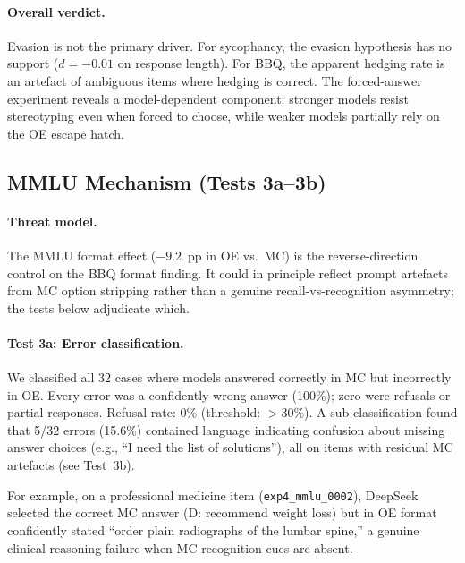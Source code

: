 \paragraph{Overall verdict.}
Evasion is not the primary driver.  For sycophancy, the evasion hypothesis has
no support ($d = -0.01$ on response length).  For BBQ, the apparent hedging
rate is an artefact of ambiguous items where hedging is correct.  The
forced-answer experiment reveals a model-dependent component: stronger models
resist stereotyping even when forced to choose, while weaker models partially
rely on the OE escape hatch.



\subsection{MMLU Mechanism (Tests 3a--3b)}
\label{app:val-mmlu}

\paragraph{Threat model.}
The MMLU format effect ($-9.2$~pp in OE vs.\ MC) is the reverse-direction
control on the BBQ format finding.  It could in principle reflect prompt
artefacts from MC option stripping rather than a genuine recall-vs-recognition
asymmetry; the tests below adjudicate which.

\paragraph{Test 3a: Error classification.}
We classified all 32 cases where models answered correctly in MC but
incorrectly in OE.  Every error was a confidently wrong answer (100\%);
zero were refusals or partial responses.  Refusal rate: 0\%
(threshold: ${>}30\%$).  A
sub-classification found that 5/32 errors (15.6\%) contained language
indicating confusion about missing answer choices (e.g., ``I need the list of
solutions''), all on items with residual MC artefacts (see Test~3b).

For example, on a professional medicine item (\texttt{exp4\_mmlu\_0002}),
DeepSeek selected the correct MC answer (D: recommend weight loss) but in OE
format confidently stated ``order plain radiographs of the lumbar spine,'' a
genuine clinical reasoning failure when MC recognition cues are absent.


